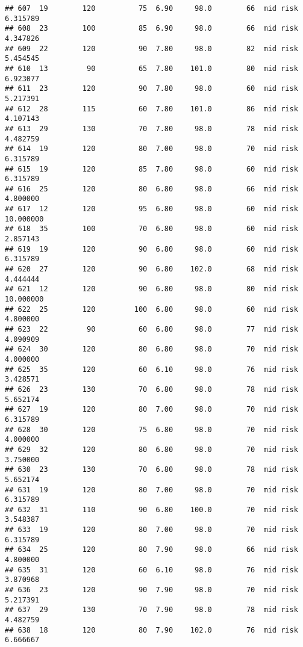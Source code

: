 \documentclass[
  ignorenonframetext,
]{beamer}
\begin{document}
\begin{frame}[fragile]
\begin{verbatim}
## 607  19        120          75  6.90     98.0        66  mid risk      6.315789
## 608  23        100          85  6.90     98.0        66  mid risk      4.347826
## 609  22        120          90  7.80     98.0        82  mid risk      5.454545
## 610  13         90          65  7.80    101.0        80  mid risk      6.923077
## 611  23        120          90  7.80     98.0        60  mid risk      5.217391
## 612  28        115          60  7.80    101.0        86  mid risk      4.107143
## 613  29        130          70  7.80     98.0        78  mid risk      4.482759
## 614  19        120          80  7.00     98.0        70  mid risk      6.315789
## 615  19        120          85  7.80     98.0        60  mid risk      6.315789
## 616  25        120          80  6.80     98.0        66  mid risk      4.800000
## 617  12        120          95  6.80     98.0        60  mid risk     10.000000
## 618  35        100          70  6.80     98.0        60  mid risk      2.857143
## 619  19        120          90  6.80     98.0        60  mid risk      6.315789
## 620  27        120          90  6.80    102.0        68  mid risk      4.444444
## 621  12        120          90  6.80     98.0        80  mid risk     10.000000
## 622  25        120         100  6.80     98.0        60  mid risk      4.800000
## 623  22         90          60  6.80     98.0        77  mid risk      4.090909
## 624  30        120          80  6.80     98.0        70  mid risk      4.000000
## 625  35        120          60  6.10     98.0        76  mid risk      3.428571
## 626  23        130          70  6.80     98.0        78  mid risk      5.652174
## 627  19        120          80  7.00     98.0        70  mid risk      6.315789
## 628  30        120          75  6.80     98.0        70  mid risk      4.000000
## 629  32        120          80  6.80     98.0        70  mid risk      3.750000
## 630  23        130          70  6.80     98.0        78  mid risk      5.652174
## 631  19        120          80  7.00     98.0        70  mid risk      6.315789
## 632  31        110          90  6.80    100.0        70  mid risk      3.548387
## 633  19        120          80  7.00     98.0        70  mid risk      6.315789
## 634  25        120          80  7.90     98.0        66  mid risk      4.800000
## 635  31        120          60  6.10     98.0        76  mid risk      3.870968
## 636  23        120          90  7.90     98.0        70  mid risk      5.217391
## 637  29        130          70  7.90     98.0        78  mid risk      4.482759
## 638  18        120          80  7.90    102.0        76  mid risk      6.666667

\end{verbatim}
\end{frame}
\end{document}
